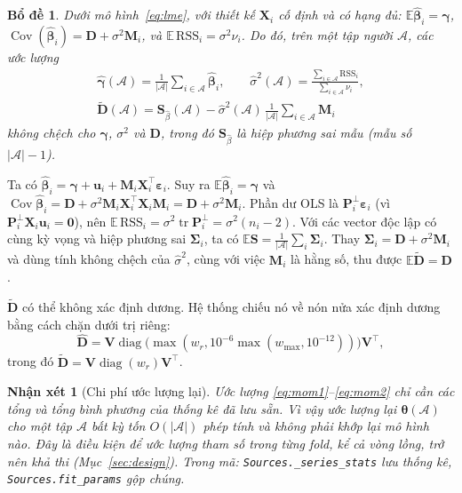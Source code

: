 \documentclass[journal]{IEEEtran}
\newtheorem{lemma}{Bổ đề}
\newtheorem{remark}{Nhận xét}
\newcommand{\code}[1]{\texttt{#1}}
\begin{document}
\begin{lemma}
Dưới mô hình~\eqref{eq:lme}, với thiết kế $\bm X_i$ cố định và có hạng đủ: $\mathbb E\hat{\bm\beta}_i=\bm\gamma$, $\operatorname{Cov}(\hat{\bm\beta}_i)=\bm D+\sigma^2\bm M_i$, và $\mathbb E\,\mathrm{RSS}_i=\sigma^2\nu_i$. Do đó, trên một tập người $\mathcal A$, các ước lượng
\begin{gather}
\hat{\bm\gamma}(\mathcal A)=\frac{1}{|\mathcal A|}\sum_{i\in\mathcal A}\hat{\bm\beta}_i,\qquad \hat\sigma^2(\mathcal A)=\frac{\sum_{i\in\mathcal A}\mathrm{RSS}_i}{\sum_{i\in\mathcal A}\nu_i},\label{eq:mom1}\\
\tilde{\bm D}(\mathcal A)=\bm S_{\hat\beta}(\mathcal A)-\hat\sigma^2(\mathcal A)\,\frac{1}{|\mathcal A|}\sum_{i\in\mathcal A}\bm M_i\label{eq:mom2}
\end{gather}
không chệch cho $\bm\gamma$, $\sigma^2$ và $\bm D$, trong đó $\bm S_{\hat\beta}$ là hiệp phương sai mẫu (mẫu số $|\mathcal A|-1$).
\end{lemma}
\begin{IEEEproof}
Ta có $\hat{\bm\beta}_i=\bm\gamma+\bm u_i+\bm M_i\bm X_i^\top\bm\varepsilon_i$. Suy ra $\mathbb E\hat{\bm\beta}_i=\bm\gamma$ và $\operatorname{Cov}\hat{\bm\beta}_i=\bm D+\sigma^2\bm M_i\bm X_i^\top\bm X_i\bm M_i=\bm D+\sigma^2\bm M_i$. Phần dư OLS là $\bm P_i^\perp\bm\varepsilon_i$ (vì $\bm P_i^\perp\bm X_i\bm u_i=\bm 0$), nên $\mathbb E\,\mathrm{RSS}_i=\sigma^2\operatorname{tr}\bm P_i^\perp=\sigma^2(n_i-2)$. Với các vector độc lập có cùng kỳ vọng và hiệp phương sai $\bm\Sigma_i$, ta có $\mathbb E\bm S=\frac{1}{|\mathcal A|}\sum_i\bm\Sigma_i$. Thay $\bm\Sigma_i=\bm D+\sigma^2\bm M_i$ và dùng tính không chệch của $\hat\sigma^2$, cùng với việc $\bm M_i$ là hằng số, thu được $\mathbb E\tilde{\bm D}=\bm D$.
\end{IEEEproof}

$\tilde{\bm D}$ có thể không xác định dương. Hệ thống chiếu nó về nón nửa xác định dương bằng cách chặn dưới trị riêng:
\begin{equation}\label{eq:psd}
\hat{\bm D}=\bm V\operatorname{diag}\bigl(\max(w_r, 10^{-6}\max(w_{\max},10^{-12}))\bigr)\bm V^\top,
\end{equation}
trong đó $\tilde{\bm D}=\bm V\operatorname{diag}(w_r)\bm V^\top$.

\begin{remark}[Chi phí ước lượng lại]
Ước lượng \eqref{eq:mom1}--\eqref{eq:mom2} chỉ cần các tổng và tổng bình phương của thống kê đã lưu sẵn. Vì vậy ước lượng lại $\bm\theta(\mathcal A)$ cho một tập $\mathcal A$ bất kỳ tốn $O(|\mathcal A|)$ phép tính và không phải khớp lại mô hình nào. Đây là điều kiện để ước lượng tham số trong từng fold, kể cả vòng lồng, trở nên khả thi (Mục~\ref{sec:design}). Trong mã: \code{Sources.\_series\_stats} lưu thống kê, \code{Sources.fit\_params} gộp chúng.
\end{remark}
\end{document}
